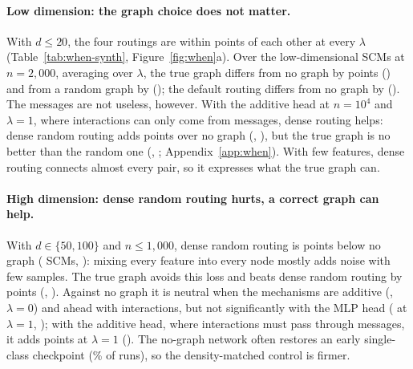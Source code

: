 \documentclass[anon,12pt]{clear2027} %
\begin{document}
\paragraph{Low dimension: the graph choice does not matter.}
With $d\le20$, the four routings are within \SynLowSpread{} points of each other at every $\lambda$ (Table~\ref{tab:when-synth}, Figure~\ref{fig:when}a). Over the \SynLowTrueNoneN{} low-dimensional SCMs at $n=2{,}000$, averaging over $\lambda$, the true graph differs from no graph by \SynLowTrueNone{} points (\SynLowTrueNonePe{}) and from a random graph by \SynLowTrueRand{} (\SynLowTrueRandPe{}); the default routing differs from no graph by \SynLowLearnNone{} (\SynLowLearnNonePe{}). The messages are not useless, however. With the additive head at $n=10^4$ and $\lambda=1$, where interactions can only come from messages, dense routing helps: dense random routing adds \SynBigAddRandNone{} points over no graph (\SynBigAddRandNonePe{}, \SynBigAddRandNoneWL{}), but the true graph is no better than the random one (\SynBigAddTrueRand{}, \SynBigAddTrueRandPe{}; Appendix~\ref{app:when}). With few features, dense routing connects almost every pair, so it expresses what the true graph can.

\paragraph{High dimension: dense random routing hurts, a correct graph can help.}
With $d\in\{50,100\}$ and $n\le1{,}000$, dense random routing is \SynHighRandNoneAbs{} points below no graph (\SynHighRandNoneWL{} SCMs, \SynHighRandNonePe{}): mixing every feature into every node mostly adds noise with few samples. The true graph avoids this loss and beats dense random routing by \SynHighTrueRandAbs{} points (\SynHighTrueRandWL{}, \SynHighTrueRandPe{}). Against no graph it is neutral when the mechanisms are additive (\SynHighTrueNoneLamZero{}, $\lambda=0$) and ahead with interactions, but not significantly with the MLP head (\SynHighTrueNoneLamOne{} at $\lambda=1$, \SynHighTrueNoneLamOnePe{}); with the additive head, where interactions must pass through messages, it adds \SynHighAddTrueNoneLamOne{} points at $\lambda=1$ (\SynHighAddTrueNoneLamOnePe{}). The no-graph network often restores an early single-class checkpoint (\SynHighEarlyRestore{}\% of runs), so the density-matched control is firmer.
\end{document}
